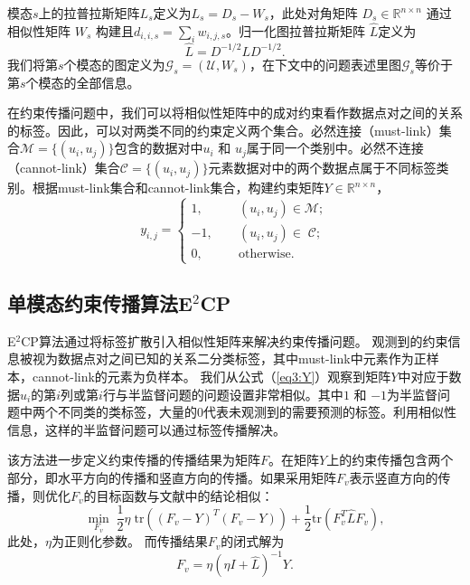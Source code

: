模态$s$上的拉普拉斯矩阵$ {L}_s $定义为$ {L}_s={D}_s-{W}_s $，此处对角矩阵
$ {D}_s \in \mathbb{R}^{n\times n}$ 通过相似性矩阵 $ {W}_s$ 构建且$ d_{i,i,s} =\sum_i w_{i,j,s}$\cite{chung1997spectral}。归一化图拉普拉斯矩阵 $ \hat{{L}} $定义为
\begin{equation}
	\hat{{L}} = {D}^{-1/2}{LD}^{-1/2}.
\end{equation}
我们将第$s$个模态的图定义为$\mathcal{G}_s = (\mathcal{U},{W}_s)$，在下文中的问题表述里图$\mathcal{G}_s$等价于第$s$个模态的全部信息。

在约束传播问题中，我们可以将相似性矩阵中的成对约束看作数据点对之间的关系的标签。因此，可以对两类不同的约束定义两个集合。必然连接（must-link）集合$ \mathcal{M} = \{(u_i,u_j)\} $包含的数据对中$ u_i $ 和 $ u_j $属于同一个类别中。必然不连接（cannot-link）集合$ \mathcal{C} = \{(u_i,u_j)\}$元素数据对中的两个数据点属于不同标签类别。根据must-link集合和cannot-link集合，构建约束矩阵$ {Y} \in  \mathbb{R}^{n\times n}$，
\begin{equation}
y_{i,j} = 
\begin{cases}
1, \qquad&(u_i,u_j)\in \mathcal{M};\\
-1, &(u_i,u_j)\in\; \mathcal{C};\\
0, &\text{otherwise}.
\end{cases}
\label{eq3:Y}
\end{equation}

\subsection{单模态约束传播算法E$^2$CP}
E$^2$CP算法通过将标签扩散引入相似性矩阵来解决约束传播问题。
观测到的约束信息被视为数据点对之间已知的关系二分类标签，其中must-link中元素作为正样本，cannot-link的元素为负样本。
我们从公式（\ref{eq3:Y}）观察到矩阵$Y$中对应于数据$u_i$的第$i$列或第$i$行与半监督问题的问题设置非常相似。其中$ 1 $ 和 $ -1 $为半监督问题中两个不同类的类标签，大量的$0$代表未观测到的需要预测的标签。利用相似性信息，这样的半监督问题可以通过标签传播\cite{zhou2004learning}解决。

该方法进一步定义约束传播的传播结果为矩阵$F$。在矩阵$Y$上的约束传播包含两个部分，即水平方向的传播和竖直方向的传播。如果采用矩阵$F_v$表示竖直方向的传播，则优化$F_v$的目标函数与文献\parencite{zhou2004learning}中的结论相似：
\begin{equation}
	\mathop{\mathrm{min}}_{{F}_v}\;\frac{1}{2}\eta\;\mathrm{tr}(({F}_v-{Y})^T({F}_v-{Y}))+\frac{1}{2}\mathrm{tr}({F}_v^T\hat{{L}}{F}_v), 
\end{equation}
此处，$ \eta $为正则化参数。
而传播结果$F_v$的闭式解为
\begin{equation}
	{F}_v = \eta(\eta{I}+\hat{{L}})^{-1}{Y}.
\end{equation}

